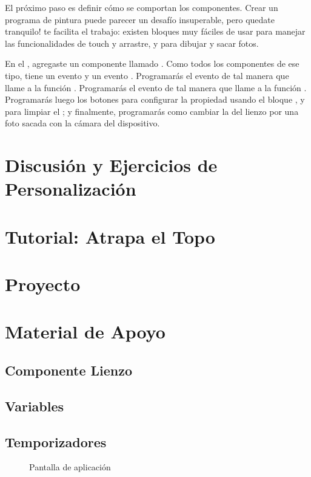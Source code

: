 El próximo paso es definir cómo se comportan los componentes. Crear un
programa de pintura puede parecer un desafío insuperable, pero quedate
tranquilo! \AppInventor te facilita el trabajo: existen bloques muy
fáciles de usar para manejar las funcionalidades de touch y arrastre,
y para dibujar y sacar fotos.

En el \designer, agregaste un componente  llamado
. Como todos los componentes de ese tipo,
 tiene un evento  y un evento
. Programarás el evento 
de tal manera que llame a la función
. Programarás el evento
 de tal manera que llame a la función
. Programarás luego los botones para
configurar la propiedad  usando el bloque
, y para limpiar el
; y finalmente, programarás como cambiar la
 del lienzo por una foto sacada con la cámara
del dispositivo.

\section{Discusión y Ejercicios de Personalización}

\section{Tutorial: Atrapa el Topo}

\section{Proyecto}

\section{Material de Apoyo}

\subsection*{Componente Lienzo}

\subsection*{Variables}

\subsection*{Temporizadores}

\begin{figure}[H]
\centering
\caption{Pantalla de aplicación }
\label{fig:holaGatito}
\end{figure}





